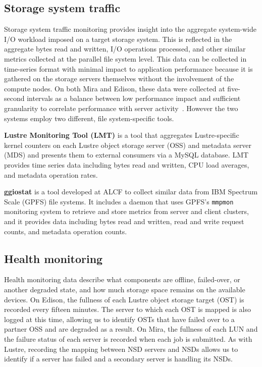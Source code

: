 \subsection{Storage system traffic} \label{sec:methods/storagesystraffic}

Storage system traffic monitoring provides insight into the aggregate system-wide I/O workload imposed on a target storage system.
This is reflected in the aggregate bytes read and written, I/O operations processed, and other similar metrics collected at the parallel file system level.
This data can be collected in time-series format with minimal impact to application performance because it is gathered on the storage servers themselves without the involvement of the compute nodes.
On both Mira and Edison, these data were collected at five-second intervals as a balance between low performance impact and sufficient granularity to correlate performance with server activity~\cite{madireddy2017}.  However the two systems employ two different, file system-specific tools.  

\label{sec:methods/lmt}
\textbf{Lustre Monitoring Tool (LMT)} is a tool that aggregates Lustre-specific kernel counters on each Lustre object storage server (OSS) and metadata server (MDS) and presents them to external consumers via a MySQL database.
LMT provides time series data including bytes read and written, CPU load averages, and metadata operation rates.

\label{sec:methods/ggiostat}
\textbf{ggiostat} is a tool developed at ALCF to collect similar data from IBM Spectrum Scale (GPFS) file systems.
It includes a daemon that uses GPFS's \texttt{mmpmon} monitoring system to retrieve and store metrics from server and client clusters, and it provides data including bytes read and written, read and write request counts, and metadata operation counts.

\subsection{Health monitoring} \label{sec:methods/health}

Health monitoring data describe what components are offline, failed-over, or another degraded state, and how much storage space remains on the available devices.
On Edison, the fullness of each Lustre object storage target (OST) is recorded every fifteen minutes.  The server to which each OST is mapped is also logged at this time, allowing us to identify OSTs that have failed over to a partner OSS and are degraded as a result.
On Mira, the fullness of each LUN and the failure status of each server is recorded when each job is submitted.
As with Lustre, recording the mapping between NSD servers and NSDs allows us to identify if a server has failed and a secondary server is handling its NSDs.

